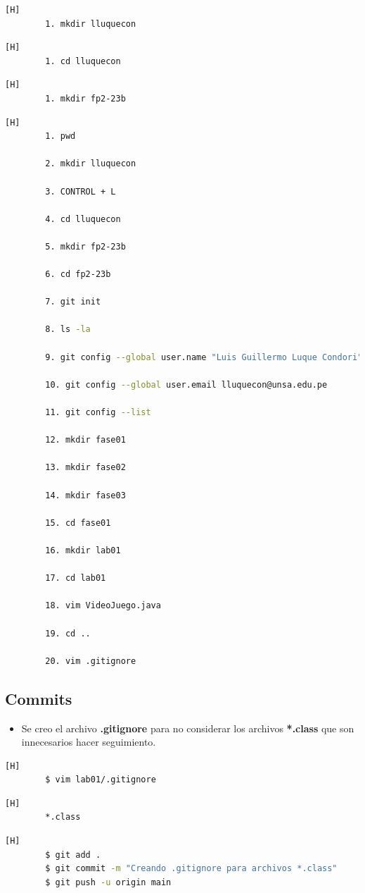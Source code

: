 \documentclass{article}
\begin{document}
	\begin{lstlisting}[language=bash,caption={Creando directorio de trabajo}][H]
		1. mkdir lluquecon
	\end{lstlisting}
	\begin{lstlisting}[language=bash,caption={Dirijíéndonos al directorio de trabajo}][H]
		1. cd lluquecon
	\end{lstlisting}	
	\begin{lstlisting}[language=bash,caption={Creando directorio para repositorio GitHub}][H]
		1. mkdir fp2-23b
	\end{lstlisting}
	\begin{lstlisting}[language=bash,caption={Inicializando directorio para repositorio GitHub}][H]
		1. pwd

		2. mkdir lluquecon

		3. CONTROL + L

		4. cd lluquecon

		5. mkdir fp2-23b

		6. cd fp2-23b

		7. git init

		8. ls -la
		
		9. git config --global user.name "Luis Guillermo Luque Condori"

		10. git config --global user.email lluquecon@unsa.edu.pe

		11. git config --list

		12. mkdir fase01

		13. mkdir fase02

		14. mkdir fase03

		15. cd fase01

		16. mkdir lab01

		17. cd lab01

		18. vim VideoJuego.java

		19. cd ..

		20. vim .gitignore

	\end{lstlisting}
	
	\subsection{Commits}
	\begin{itemize}	
		\item Se creo el archivo \textbf{.gitignore} para no considerar los archivos \textbf{*.class} que son innecesarios hacer seguimiento.
	\end{itemize}
	\begin{lstlisting}[language=bash,caption={Creando .gitignore}][H]
		$ vim lab01/.gitignore
	\end{lstlisting}
	\begin{lstlisting}[language=bash,caption={lab01/.gitignore}][H]
		*.class
	\end{lstlisting}
	\begin{lstlisting}[language=bash,caption={Commit: Creando .gitignore para archivos *.class}][H]
		$ git add .
		$ git commit -m "Creando .gitignore para archivos *.class"			
		$ git push -u origin main
	\end{lstlisting}
	
\end{document}

